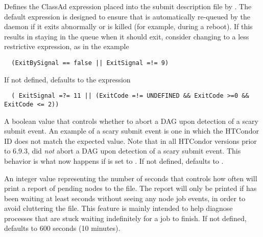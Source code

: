 \begin{description}
\label{param:DAGManOnExitRemove}
\item[\Macro{DAGMAN\_ON\_EXIT\_REMOVE}]
  Defines the  ClassAd expression placed
  into the  submit description file by .
  The default expression is designed to ensure that  is
  automatically re-queued by the  daemon if it exits abnormally
  or is killed (for example, during a reboot).
  If this results in 
  staying in the queue when it should exit, consider changing 
  to a less restrictive expression, as in the example
\footnotesize
\begin{verbatim}
  (ExitBySignal == false || ExitSignal =!= 9)
\end{verbatim}
\normalsize
  If not defined,  defaults to
  the expression
\footnotesize
\begin{verbatim}
  ( ExitSignal =?= 11 || (ExitCode =!= UNDEFINED && ExitCode >=0 && ExitCode <= 2))
\end{verbatim}
\normalsize

\item[\Macro{DAGMAN\_ABORT\_ON\_SCARY\_SUBMIT}]
\label{param:DAGManAbortOnScarySubmit}
  A boolean value that controls whether to abort a DAG upon detection of
  a scary submit event.
  An example of a scary submit event is one in which the HTCondor ID
  does not match the expected value.
  Note that in all HTCondor versions prior to 6.9.3,
   did \emph{not} abort a DAG upon detection of
  a scary submit event.
  This behavior is what now happens if
   is set to .
  If not defined,  defaults to
  .

\label{param:DAGManPendingReportInterval}
\item[\Macro{DAGMAN\_PENDING\_REPORT\_INTERVAL}]
  An integer value representing the number of seconds that controls
  how often 
  will print a report of pending nodes to the  file.
  The report will only be printed if  has
  been waiting at least 
  seconds without seeing any node job events, in order to
  avoid cluttering the  file.
  This feature is mainly intended to help diagnose  processes 
  that are stuck waiting indefinitely for a job to finish.
  If not defined,
   defaults to 600 seconds
  (10 minutes).


\end{description}
